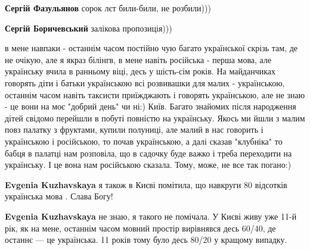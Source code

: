 \begin{itemize}
\begin{itemize}
\textbf{Сергій Фазульянов} сорок лєт били-били, не розбили)))

 
\textbf{Сергій Боричевський} залікова пропозиція)))

\end{itemize}

 

в мене навпаки - останнім часом постійно чую багато української скрізь там, де
не очікую, але я якраз білінгв, в мене навіть російська - перша мова, але
українську вчила в ранньому віці, десь у шість-сім років. На майданчиках
говорять діти і батьки українською всі розвивашки для малих - українською,
останнім часом навіть таксисти приїжджають і говорять українською, але не знаю
- це вони на моє "добрий день" чи ні:) Київ. Багато знайомих після народження
дітей свідомо перейшли в побуті повністю на українську. Якось ми йшли з малим
повз палатку з фруктами, купили полуниці, але малий в нас говорить і
українською і російською, то почав українською, а далі сказав "клубніка" то
бабця в палатці нам розповіла, що в садочку буде важко і треба переходити на
українську. І це вона нам російською сказала. Тому, може, не все так погано:)

\begin{itemize}
 
\textbf{Evgenia Kuzhavskaya} я також в Києві помітила, що навкруги 80 відсотків українська мова . Слава Богу!

 
\textbf{Evgenia Kuzhavskaya} не знаю, я такого не помічала. У Києві живу уже
11-й рік, як на мене, останнім часом мовний простір вирівнявся десь 60/40, де
останнє — це українська. 11 років тому було десь 80/20 у кращому випадку.


\end{itemize}
\end{itemize}
